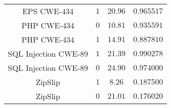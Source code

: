 \begin{table}[ht]
\begin{tabular}{c|c|c|c}
            EPS CWE-434 & 	        $1$ & 	$20.96$ & 	$0.965517$ \\
            PHP CWE-434 &         	$0$ & 	$10.81$ & 	$0.935591$ \\
            PHP CWE-434 & 	        $1$ & 	$14.91$ & 	$0.887810$ \\
            \rowcolor{GruvGray!16}
            SQL Injection CWE-89 & 	$1$ & 	$21.39$ & 	$0.990278$ \\
            \rowcolor{GruvGray!16}
            SQL Injection CWE-89 & 	$0$ & 	$24.90$ & 	$0.974000$ \\
            ZipSlip & 	            $1$ & 	$8.26$ &  	$0.187500$ \\
            ZipSlip & 	            $0$ & 	$21.01$ & 	$0.176020$ \\
        \end{tabular}
        \caption{}
        \label{tab:LSTM_time_erg}
    \end{table}


